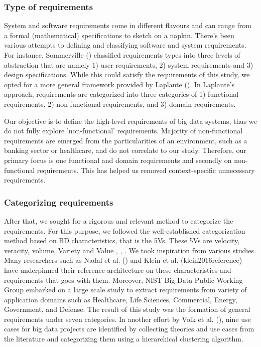 \documentclass[conference]{IEEEtran}
\begin{document}
\subsubsection{Type of requirements}
System and software requirements come in different flavours and can range from a formal (mathematical) specifications to sketch on a napkin. There's been various attempts to defining and classifying software and system requirements. For instance, Sommerville (\cite{sommerville2011software}) classified requirements types into three levels of abstraction that are namely 1) user requirements, 2) system requirements and 3) design specifications. While this could satisfy the requirements of this study, we opted for a more general framework provided by Laplante (\cite{laplante2017requirements}). In Laplante's approach, requirements are categorized into three categories of 1) functional requirements, 2) non-functional requirements, and 3) domain requirements. 

Our objective is to define the high-level requirements of big data systems, thus we do not fully explore 'non-functional' requirements. Majority of non-functional requirements are emerged from the particularities of an environment, such as a banking sector or healthcare, and do not correlate to our study. Therefore, our primary focus is one functional and domain requirements and secondly on non-functional requirements. This has helped us removed context-specific unnecessary requirements. 

\subsubsection{Categorizing requirements} After that, we sought for a rigorous and relevant method to categorize the requirements. For this purpose, we followed the well-established categorization method based on BD characteristics, that is the 5Vs. These 5Vs are velocity, veracity, volume, Variety and Value \cite{Demchenko2014}, \cite{Bughin2016}, \cite{rad2017big}. We took inspiration from various studies. Many researchers such as Nadal et al. (\cite{nadal2017software}) and Klein et al. (klein2016reference) have underpinned their reference architecture on these characteristics and requirements that goes with them. Moreover, NIST Big Data Public Working Group embarked on a large scale study to extract requirements from variety of application domains such as Healthcare, Life Sciences, Commercial, Energy, Government, and Defense. The result of this study was the formation of general requirements under seven categories. In another effort by Volk et al. (\cite{volk2020identifying}), nine use cases for big data projects are identified by collecting theories and use cases from the literature and categorizing them using a hierarchical clustering algorithm. 
\end{document}

